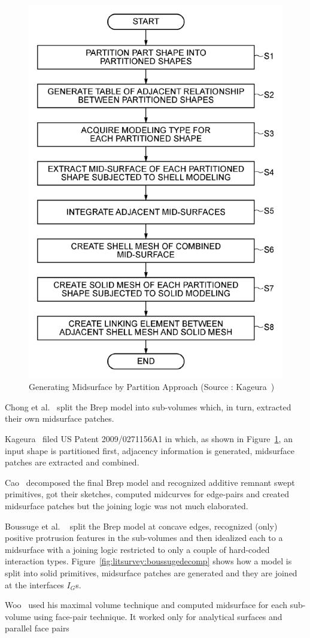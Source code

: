 \begin{figure}[!h]
\centering     %
\includegraphics[width=0.45\linewidth,valign=t]{images/Kageura}
\caption{Generating Midsurface by Partition Approach (Source : Kageura~\cite{Kageura2009})}
\label{fig:litsurvey:Kageura}
\end{figure}


Chong et al.~\cite{Chong2004} split the Brep model into sub-volumes which, in turn, extracted their own midsurface patches.

Kageura~\cite{Kageura2009} filed US Patent 2009/0271156A1 in which, as shown in Figure~\ref{fig:litsurvey:Kageura}, an input shape is partitioned first, adjacency information is generated, midsurface patches are extracted and combined.

Cao~\cite{Cao2009, Cao2011} decomposed the final Brep model and recognized additive remnant swept primitives, got their sketches, computed midcurves for edge-pairs and created midsurface patches but the joining logic was not much elaborated. 

Boussuge et al. ~\cite{Boussuge2013,Boussuge2013a}  split the Brep model at concave edges, recognized (only) positive  protrusion features in the sub-volumes and then idealized each to a midsurface with a joining logic restricted to only a couple of hard-coded interaction types. Figure~\ref{fig:litsurvey:boussugedecomp} shows how a model is split into solid primitives, midsurface patches are generated and they are joined at the interfaces $I_G$s.

Woo~\cite{Woo2013} used his maximal volume technique \cite{Woo2006, Woo2009} and computed midsurface for each sub-volume using face-pair technique. It worked only for analytical surfaces and parallel face pairs

